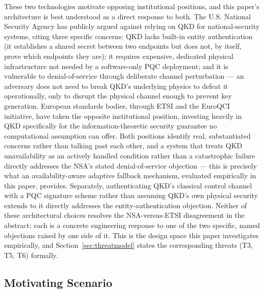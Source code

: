 \documentclass[journal]{IEEEtran}
\begin{document}
These two technologies motivate opposing institutional positions, and this paper's architecture is best understood as a direct response to both. The U.S. National Security Agency has publicly argued against relying on QKD for national-security systems, citing three specific concerns: QKD lacks built-in entity authentication (it establishes a shared secret between two endpoints but does not, by itself, prove which endpoints they are); it requires expensive, dedicated physical infrastructure not needed by a software-only PQC deployment; and it is vulnerable to denial-of-service through deliberate channel perturbation --- an adversary does not need to break QKD's underlying physics to defeat it operationally, only to disrupt the physical channel enough to prevent key generation. European standards bodies, through ETSI and the EuroQCI initiative, have taken the opposite institutional position, investing heavily in QKD specifically for the information-theoretic security guarantee no computational assumption can offer. Both positions identify real, substantiated concerns rather than talking past each other, and a system that treats QKD unavailability as an actively handled condition rather than a catastrophic failure directly addresses the NSA's stated denial-of-service objection --- this is precisely what an availability-aware adaptive fallback mechanism, evaluated empirically in this paper, provides. Separately, authenticating QKD's classical control channel with a PQC signature scheme rather than assuming QKD's own physical security extends to it directly addresses the entity-authentication objection. Neither of these architectural choices resolves the NSA-versus-ETSI disagreement in the abstract; each is a concrete engineering response to one of the two specific, named objections raised by one side of it. This is the design space this paper investigates empirically, and Section~\ref{sec:threatmodel} states the corresponding threats (T3, T5, T6) formally.

\subsection{Motivating Scenario}
\end{document}
